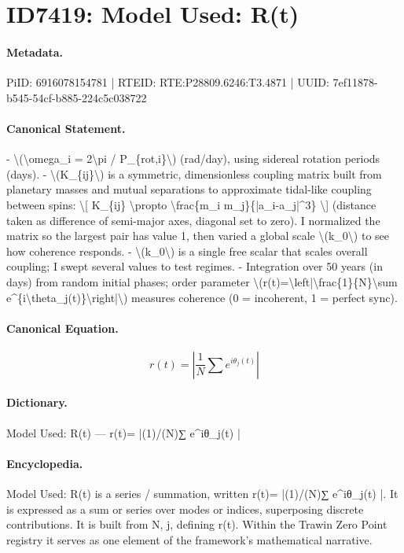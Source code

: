 \section*{ID7419: Model Used: R(t)}
\paragraph{Metadata.}
PiID: 6916078154781 | RTEID: RTE:P28809.6246:T3.4871 | UUID: 7ef11878-b545-54cf-b885-224c5c038722

\paragraph{Canonical Statement.}
- \textbackslash{}(\textbackslash{}omega\_i = 2\textbackslash{}pi / P\_\{rot,i\}\textbackslash{}) (rad/day), using sidereal rotation periods (days). - \textbackslash{}(K\_\{ij\}\textbackslash{}) is a symmetric, dimensionless coupling matrix built from planetary masses and mutual separations to approximate tidal-like coupling between spins: \textbackslash{}[ K\_\{ij\} \textbackslash{}propto \textbackslash{}frac\{m\_i m\_j\}\{|a\_i-a\_j|\textasciicircum{}3\} \textbackslash{}] (distance taken as difference of semi-major axes, diagonal set to zero). I normalized the matrix so the largest pair has value 1, then varied a global scale \textbackslash{}(k\_0\textbackslash{}) to see how coherence responds. - \textbackslash{}(k\_0\textbackslash{}) is a single free scalar that scales overall coupling; I swept several values to test regimes. - Integration over 50 years (in days) from random initial phases; order parameter \textbackslash{}(r(t)=\textbackslash{}left|\textbackslash{}frac\{1\}\{N\}\textbackslash{}sum e\textasciicircum{}\{i\textbackslash{}theta\_j(t)\}\textbackslash{}right|\textbackslash{}) measures coherence (0 = incoherent, 1 = perfect sync).

\paragraph{Canonical Equation.}
\[
r(t)=\left|\frac{1}{N}\sum e^{i\theta_j(t)}\right|
\]

\paragraph{Dictionary.}
Model Used: R(t) — r(t)= |(1)/(N)∑ e\textasciicircum{}iθ\_j(t) |

\paragraph{Encyclopedia.}
Model Used: R(t) is a series / summation, written r(t)= |(1)/(N)∑ e\textasciicircum{}iθ\_j(t) |. It is expressed as a sum or series over modes or indices, superposing discrete contributions. It is built from N, j, defining r(t). Within the Trawin Zero Point registry it serves as one element of the framework's mathematical narrative.
